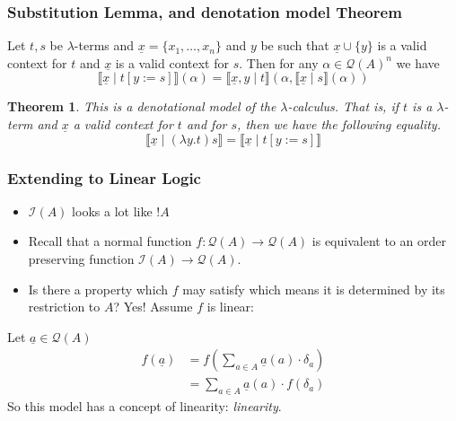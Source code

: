 \documentclass{beamer}
\theoremstyle{plain}
\newtheorem{thm}{Theorem}[subsection] %
\theoremstyle{definition}
\newcommand{\call}[1]{\mathcal{#1}}
\newcommand{\lto}{\longrightarrow}
\begin{document}
\begin{frame}
\frametitle{Substitution Lemma, and denotation model Theorem}
\begin{lemma}
		Let $t,s$ be $\lambda$-terms and $\underline{x} = \{ x_1, \ldots, x_{n} \}$ and $y$ be such that $\underline{x} \cup \{ y \}$ is a valid context for $t$ and $\underline{x}$ is a valid context for $s$. Then for any $\alpha\in \call{Q}(A)^{n}$ we have
		\begin{equation*}\label{eq:sub_lem_cond}
			\llbracket \underline{x} \mid t[y := s]\rrbracket(\alpha) = \llbracket \underline{x}, y \mid t \rrbracket(\alpha, \llbracket \underline{x} \mid s \rrbracket (\alpha))
			\end{equation*}
		\end{lemma}

\begin{thm}\label{thm:denotational_model}
		This is a denotational model of the $\lambda$-calculus. That is, if $t$ is a $\lambda$-term and $\underline{x}$ a valid context for $t$ and for $s$, then we have the following equality.
		\begin{equation*}
			\llbracket \underline{x} \mid (\lambda y. t)s\rrbracket = \llbracket \underline{x} \mid t[y:=s]\rrbracket
			\end{equation*}
		\end{thm}
\end{frame}
	\begin{frame}
	\frametitle{Extending to Linear Logic}
\begin{itemize}
	\item $\call{I}(A)$ looks a lot like $!A$
\item Recall that a normal function $f: \call{Q}(A) \lto \call{Q}(A)$ is equivalent to an order preserving function $\call{I}(A) \lto \call{Q}(A)$.
\item Is there a property which $f$ may satisfy which means it is determined by its restriction to $A$? Yes! Assume $f$ is linear:
\end{itemize}
	  Let $\underline{a} \in \call{Q}(A)$
	\begin{align*}
	f(\underline{a}) &= f(\sum_{a \in A}\underline{a}(a) \cdot \delta_{a})\\
	&=\sum_{a \in A}\underline{a}(a)\cdot f(\delta_a)
	\end{align*}
	So this model has a concept of linearity: \emph{linearity}.
	\end{frame}
\end{document}
